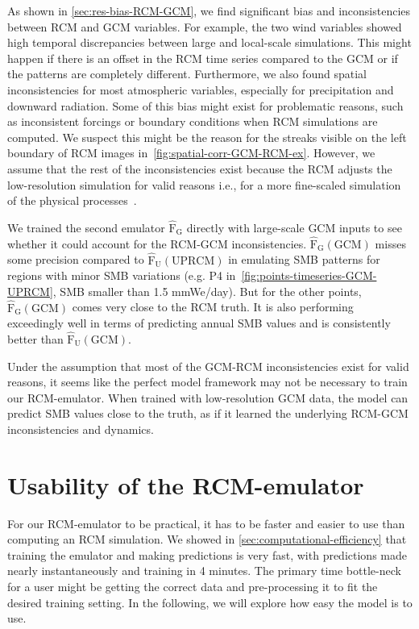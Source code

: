 \documentclass[a4paper,11pt,oneside]{report}
\begin{document}
As shown in \autoref{sec:res-bias-RCM-GCM}, we find significant bias and inconsistencies between RCM and GCM variables. For example, the two wind variables showed high temporal discrepancies between large and local-scale simulations. This might happen if there is an offset in the RCM time series compared to the GCM or if the patterns are completely different. Furthermore, we also found spatial inconsistencies for most atmospheric variables, especially for precipitation and downward radiation. Some of this bias might exist for problematic reasons, such as inconsistent forcings or boundary conditions when RCM simulations are computed. We suspect this might be the reason for the streaks visible on the left boundary of RCM images in~\autoref{fig:spatial-corr-GCM-RCM-ex}. However, we assume that the rest of the inconsistencies exist because the RCM adjusts the low-resolution simulation for valid reasons i.e., for a more fine-scaled simulation of the physical processes~\cite{Doury, S_rland_2018, Vasubandhu2007, Noguer1998, Laprise2008ChallengingST}. 


 We trained the second emulator $\mathrm{\hat{F}_{G}}$ directly with large-scale GCM inputs to see whether it could account for the RCM-GCM inconsistencies. $\mathrm{\hat{F}_{G}(GCM)}$ misses some precision compared to $\mathrm{\hat{F}_{U}(UPRCM)}$ in emulating SMB patterns for regions with minor SMB variations (e.g. P4 in~\autoref{fig:points-timeseries-GCM-UPRCM}, SMB smaller than 1.5 \si{mmWe/day}). But for the other points, $\mathrm{\hat{F}_{G}(GCM)}$ comes very close to the RCM truth. It is also performing exceedingly well in terms of predicting annual SMB values and is consistently better than $\mathrm{\hat{F}_{U}(GCM)}$. 


Under the assumption that most of the GCM-RCM inconsistencies exist for valid reasons, it seems like the perfect model framework may not be necessary to train our RCM-emulator. When trained with low-resolution GCM data, the model can predict SMB values close to the truth, as if it learned the underlying RCM-GCM inconsistencies and dynamics.   



\section{Usability of the RCM-emulator}\label{sec:utility-emulators}
For our RCM-emulator to be practical, it has to be faster and easier to use than computing an RCM simulation. We showed in \autoref{sec:computational-efficiency} that training the emulator and making predictions is very fast, with predictions made nearly instantaneously and training in 4 minutes. The primary time bottle-neck for a user might be getting the correct data and pre-processing it to fit the desired training setting. In the following, we will explore how easy the model is to use. 
\end{document}
